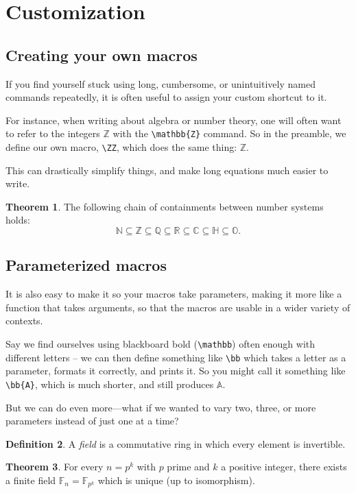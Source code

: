 \documentclass[11pt,letterpaper,titlepage]{article}
\numberwithin{equation}{section}
\numberwithin{figure}{section}
\numberwithin{table}{section}
\numberwithin{algorithm}{section}
\theoremstyle{definition}
\newtheorem{theorem}{Theorem}[section] %
\newtheorem{definition}[theorem]{Definition} %
\newcommand{\NN}{\mathbb{N}}
\newcommand{\ZZ}{\mathbb{Z}}
\newcommand{\QQ}{\mathbb{Q}}
\newcommand{\RR}{\mathbb{R}}
\newcommand{\CC}{\mathbb{C}}
\newcommand{\Qu}{\mathbb{H}}
\newcommand{\Oc}{\mathbb{O}}
\newcommand{\bb}[1]{\mathbb{#1}}
\begin{document}
\section{Customization}
\subsection{Creating your own macros}
If you find yourself stuck using long, cumbersome, or unintuitively named commands repeatedly, it is often useful to assign your custom shortcut to it.

For instance, when writing about algebra or number theory, one will often want to refer to the integers $\mathbb{Z}$ with the \verb$\mathbb{Z}$ command. So in the preamble, we define our own macro, \verb$\ZZ$, which does the same thing: $\ZZ$.


This can drastically simplify things, and make long equations much easier to write.

\begin{theorem}
    The following chain of containments between number systems holds:
    \[\NN \subseteq \ZZ \subseteq \QQ \subseteq \RR \subseteq \CC \subseteq \Qu \subseteq \Oc.\]
\end{theorem}

\subsection{Parameterized macros}
It is also easy to make it so your macros take parameters, making it more like a function that takes arguments, so that the macros are usable in a wider variety of contexts.

Say we find ourselves using blackboard bold (\verb$\mathbb$) often enough with different letters -- we can then define something like \verb$\bb$ which takes a letter as a parameter, formats it correctly, and prints it. So you might call it something like \verb$\bb{A}$, which is much shorter, and still produces $\bb{A}$.

But we can do even more---what if we wanted to vary two, three, or more parameters instead of just one at a time?

\begin{definition}
    A \textit{field} is a commutative ring in which every element is invertible.
\end{definition}

\begin{theorem}
    For every $n=p^k$ with $p$ prime and $k$ a positive integer, there exists a finite field $\mathbb{F}_n = \mathbb{F}_{p^k}$ which is unique (up to isomorphism).
\end{theorem}
\end{document}

